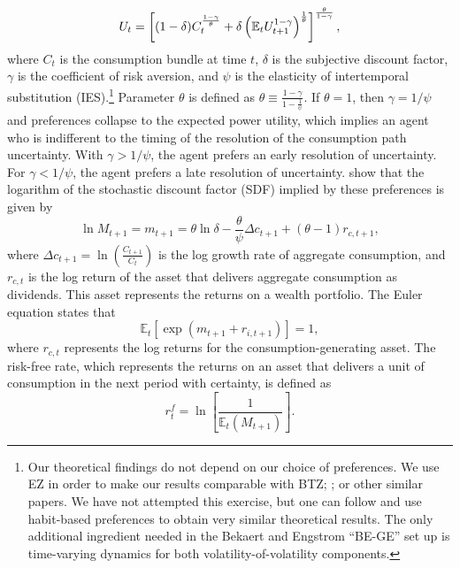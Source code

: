 \documentclass[11pt]{article}
\begin{document}
\begin{equation}
U_{t}=\left[ (1-\delta )C_{t}^{\frac{1-\gamma }{\theta }}+\delta \left(
\mathbb{E}_{t}U_{t+1}^{1-\gamma }\right) ^{\frac{1}{\theta }}\right] ^{\frac{%
\theta }{1-\gamma }},  \label{EqEZUtility}
\end{equation}%
where $C_{t}$ is the consumption bundle at time $t$, $\delta$ is the
subjective discount factor, $\gamma $ is the coefficient of risk aversion,
and $\psi $ is the elasticity of intertemporal substitution (IES).\footnote{Our theoretical findings do not depend on our choice of preferences. We use EZ in order to make our results comparable with BTZ; \cite{ShaliastovichYaronSegal14}; or other similar papers. We have not attempted this exercise, but one can follow \cite{BekaertEngstrom14} and use habit-based preferences to obtain very similar theoretical results. The only additional ingredient needed in the Bekaert and Engstrom ``BE-GE'' set up is time-varying dynamics for both volatility-of-volatility components.} Parameter
$\theta $ is defined as $\theta \equiv \frac{1-\gamma }{1-\frac{1}{\psi }}$.
If $\theta =1$, then $\gamma =1/\psi $ and \citeauthor{KrepsPorteus78Econometrica} preferences collapse to
the expected power utility, which implies an agent who is indifferent to the
timing of the resolution of the consumption path uncertainty. With $\gamma
>1/\psi $, the agent prefers an early resolution of uncertainty. For $\gamma
<1/\psi $, the agent prefers a late resolution of uncertainty. \cite{EZ89Econometrica} show that the logarithm of the stochastic discount factor
(SDF) implied by these preferences is given by
\begin{equation}
\ln M_{t+1}=m_{t+1}=\theta \ln \delta -\frac{\theta }{\psi }\Delta
c_{t+1}+(\theta -1)r_{c,t+1},  \label{EqEZlogSDF}
\end{equation}%
where $\Delta c_{t+1}=\ln \left( \frac{C_{t+1}}{C_{t}}\right) $ is the log
growth rate of aggregate consumption, and $r_{c,t}$ is the log return of the
asset that delivers aggregate consumption as dividends. This asset
represents the returns on a wealth portfolio. The Euler equation states that
\begin{equation}
\mathbb{E}_{t}\left[ \exp \left( m_{t+1}+r_{i,t+1}\right) \right] =1,
\label{EqEulerEquation4ConsAsset}
\end{equation}%
where $r_{c,t}$ represents the log returns for the consumption-generating asset. The risk-free rate, which represents the returns on an asset
that delivers a unit of consumption in the next period with certainty, is
defined as
\begin{equation}
r_{t}^{f}=\ln \left[ \frac{1}{\mathbb{E}_{t}(M_{t+1})}\right] .
\label{EqPrimaryRFREulerEquation}
\end{equation}
\end{document}
